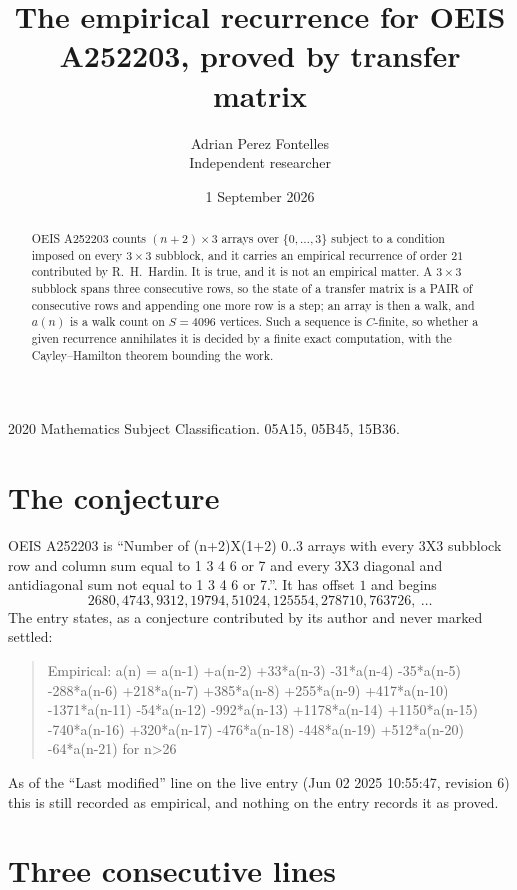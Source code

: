 \documentclass[11pt,a4paper]{article}
\title{The empirical recurrence for OEIS A252203, proved by transfer matrix}
\author{Adrian Perez Fontelles\\ \small Independent researcher}
\date{1 September 2026}
\theoremstyle{plain}
\theoremstyle{definition}
\begin{document}
\maketitle

\begin{abstract}
OEIS A252203 counts $(n+2)\times3$ arrays over $\{0,\dots,3\}$ subject to a condition imposed on
every $3\times3$ subblock, and it carries an empirical recurrence of order $21$
contributed by R.~H.~Hardin. It is true, and it is not an empirical matter. A $3\times3$
subblock spans three consecutive rows, so the state of a transfer matrix is a PAIR of
consecutive rows and appending one more row is a step; an array is then a walk, and
$a(n)$ is a walk count on $S=4096$ vertices. Such a sequence is $C$-finite, so whether a given
recurrence annihilates it is decided by a finite exact computation, with the Cayley--Hamilton
theorem bounding the work.
\end{abstract}

\noindent\small 2020 Mathematics Subject Classification. 05A15, 05B45, 15B36.\normalsize

\section{The conjecture}

OEIS A252203 is ``Number of (n+2)X(1+2) 0..3 arrays with every 3X3 subblock row and column sum equal to 1 3 4 6 or 7 and every 3X3 diagonal and antidiagonal sum not equal to 1 3 4 6 or 7.''. It has offset $1$ and begins
\[
2680, 4743, 9312, 19794, 51024, 125554, 278710, 763726,\ \dots
\]
The entry states, as a conjecture contributed by its author and never marked settled:
\begin{quote}
Empirical: a(n) = a(n-1) +a(n-2) +33*a(n-3) -31*a(n-4) -35*a(n-5) -288*a(n-6) +218*a(n-7) +385*a(n-8) +255*a(n-9) +417*a(n-10) -1371*a(n-11) -54*a(n-12) -992*a(n-13) +1178*a(n-14) +1150*a(n-15) -740*a(n-16) +320*a(n-17) -476*a(n-18) -448*a(n-19) +512*a(n-20) -64*a(n-21) for n>26
\end{quote}
As of the ``Last modified'' line on the live entry (Jun 02 2025 10:55:47, revision 6) this is still
recorded as empirical, and nothing on the entry records it as proved.

\section{Three consecutive lines}
\end{document}
